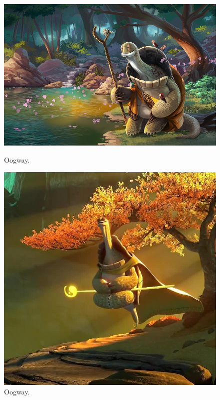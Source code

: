 \documentclass{article}
\begin{document}
\begin{figure}[h]
    \centering
    \begin{minipage}{0.45\textwidth}
        \includegraphics[width=\textwidth]{rysunek2.png}
        \caption{Oogway.}
    \end{minipage}
    \hfill
    \begin{minipage}{0.45\textwidth}
        \includegraphics[width=\textwidth]{rysunek3.png}
        \caption{Oogway.}
    \end{minipage}
\end{figure}
\end{document}
